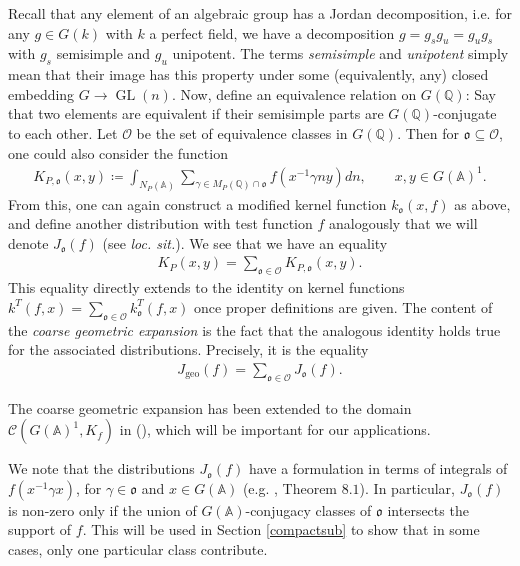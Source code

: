 \documentclass[11pt,reqno]{amsart}
\numberwithin{equation}{section}
\theoremstyle{definition}
\theoremstyle{remark}
\newcommand{\Q}{\mathbb{Q}}
\newcommand{\GL}{\operatorname{GL}}
\newcommand{\geo}{\operatorname{geo}}
\newcommand{\mf}[1]{\mathfrak{#1}}
\newcommand{\A}{\mathbb{A}}
\renewcommand{\subset}{\subseteq}
\begin{document}
Recall that any element of an algebraic group has a Jordan decomposition, i.e. for any $g\in G(k)$ with $k$ a perfect field, we have a decomposition $g=g_sg_u=g_ug_s$ with $g_s$ semisimple and $g_u$ unipotent. The terms \textit{semisimple} and \textit{unipotent} simply mean that their image has this property under some (equivalently, any) closed embedding $G\to \GL(n)$. Now, define an equivalence relation on $G(\Q)$: Say that two elements are equivalent if their semisimple parts are $G(\Q)$-conjugate to each other. Let $\mathcal{O}$ be the set of equivalence classes in $G(\Q)$. Then for $\mf{o}\subset \mathcal{O}$, one could also consider the function
\begin{align}\label{classkernel}
    K_{P,\mf{o}}(x,y)\coloneqq\int_{N_P(\A)} \sum_{\gamma\in M_P(\Q)\cap \mf{o}}f(x^{-1}\gamma n y) dn, \qquad x,y\in G(\A)^1.
\end{align}
From this, one can again construct a modified kernel function $k_{\mf{o}}(x,f)$ as above, and define another distribution with test function $f$ analogously that we will denote $J_\mf{o}(f)$ (see \textit{loc. sit.}). We see that we have an equality
\begin{align*}
    K_P(x,y) = \sum_{\mf{o}\in\mathcal{O}}K_{P,\mf{o}}(x,y).
\end{align*}
This equality directly extends to the identity on kernel functions $k^T(f,x)=\sum_{\mf{o}\in \mathcal{O}}k^T_{\mf{o}}(f,x)$ once proper definitions are given. The content of the \emph{coarse geometric expansion} is the fact that the analogous identity holds true for the associated distributions. Precisely, it is the equality
\begin{align}\label{coarsegeom}
    J_{\geo}(f) = \sum_{\mf{o}\in\mathcal{O}}J_{\mf{o}}(f).
\end{align}

\noindent The coarse geometric expansion has been extended to the domain $\mathcal{C}(G(\A)^1,K_f)$ in (\cite{FL}), which will be important for our applications.

We note that the distributions $J_{\mf{o}}(f)$ have a formulation in terms of integrals of $f(x^{-1}\gamma x)$, for $\gamma\in\mf{o}$ and $x\in G(\A)$ (e.g. \cite{Arthur5}, Theorem $8.1$). In particular, $J_{\mf{o}}(f)$ is non-zero only if the union of $G(\A)$-conjugacy classes of $\mf{o}$ intersects the support of $f$. This will be used in Section \ref{compactsub} to show that in some cases, only one particular class contribute.
\end{document}
